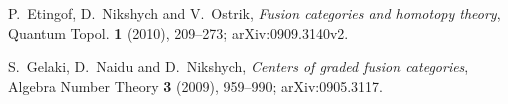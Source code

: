 P.~Etingof, D.~Nikshych and V.~Ostrik,
\emph{Fusion categories and homotopy theory},
Quantum Topol. \textbf{1} (2010), 209--273;
arXiv:0909.3140v2.

S.~Gelaki, D.~Naidu and D.~Nikshych,
\emph{Centers of graded fusion categories},
Algebra Number Theory \textbf{3} (2009), 959--990;
arXiv:0905.3117.

